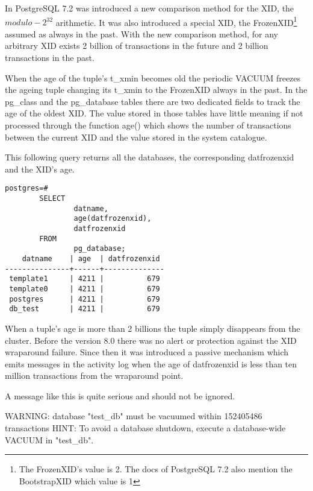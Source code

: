 In PostgreSQL 7.2 was introduced a new comparison method for the XID, the 
\begin{math}modulo-2^{32}\end{math} arithmetic. It was also introduced a special XID, the 
FrozenXID\footnote{The FrozenXID's value is 2. The docs of PostgreSQL 
7.2 also mention the BootstrapXID which value is 1} assumed as always in the past. With the new 
comparison method, for any arbitrary XID exists 2 billion of transactions in the future and 2 billion 
transactions in the past.\newline

When the age of the tuple's t\_xmin becomes old the periodic VACUUM freezes the ageing tuple 
changing its t\_xmin to the FrozenXID always in the past. In the pg\_class and the pg\_database tables 
there are  two dedicated fields to track the age of the oldest XID. The value stored in those tables 
have little meaning if not processed through the function age() which shows the number of transactions 
between the current XID and the value stored in the system catalogue. \newline

This following query returns all the databases, the corresponding datfrozenxid and the XID's age.\newpage

\begin{lstlisting}[style=pgsql]
 postgres=# 
        SELECT 
                datname,
                age(datfrozenxid),
                datfrozenxid 
        FROM 
                pg_database;
    datname    | age  | datfrozenxid 
---------------+------+--------------
 template1     | 4211 |          679
 template0     | 4211 |          679
 postgres      | 4211 |          679
 db_test       | 4211 |          679

\end{lstlisting}

When a tuple's age is more than 2 billions the tuple simply disappears  from the cluster. Before the 
version 8.0 there was no alert or protection against the XID wraparound failure. Since then it was 
introduced a passive mechanism which emits messages in the activity log when the age of datfrozenxid 
is less than ten million transactions from the wraparound point.

A message like this is quite serious and should not be ignored.
\begin{smallverbatim}
WARNING:  database "test_db" must be vacuumed within 152405486 transactions
HINT:  To avoid a database shutdown, execute a database-wide VACUUM in 
"test_db".
\end{smallverbatim}

